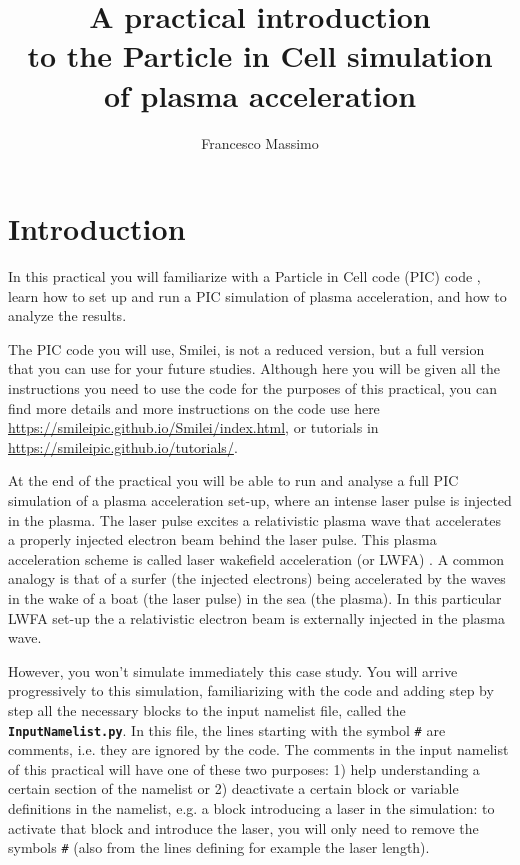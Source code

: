 \documentclass[a4paper,12pt]{extarticle}
\title{\vspace{-2.cm}A practical introduction \\to the Particle in Cell simulation \\of plasma acceleration}
\author{Francesco Massimo}
\newcommand{\smilei}{{\sc Smilei}\xspace}
\newcommand{\commandline}[1]{\texttt{\textbf{#1}}}
\begin{document}
\maketitle

\tableofcontents

\section{Introduction} %
In this practical you will familiarize with a Particle in Cell code (PIC) code \cite{LapentaPIC,BirdsallLangdon2004}, learn how to set up and run a PIC simulation of plasma acceleration, and how to analyze the results.

The PIC code you will use, \smilei \cite{Smilei2018}, is not a reduced version, but a full version that you can use for your future studies. Although here you will be given all the instructions you need to use the code for the purposes of this practical, you can find more details and more instructions on the code use here \url{https://smileipic.github.io/Smilei/index.html}, or tutorials in \url{https://smileipic.github.io/tutorials/}.

At the end of the practical you will be able to run and analyse a full PIC simulation of a plasma acceleration set-up, where an intense laser pulse is injected in the plasma. The laser pulse excites a relativistic plasma wave that accelerates a properly injected electron beam behind the laser pulse.  This plasma acceleration scheme is called laser wakefield acceleration (or LWFA) \cite{TajimaDawson79,Malka2002,Esarey2009,Malka2012}.  A common analogy is that of a surfer (the injected electrons) being accelerated by the waves in the wake of a boat (the laser pulse) in the sea (the plasma).  In this particular LWFA set-up the a relativistic electron beam is externally injected in the plasma wave.

However, you won't simulate immediately this case study.  You will arrive progressively to this simulation, familiarizing with the code and adding step by step all the necessary blocks to the input namelist file, called the \commandline{InputNamelist.py}. In this file, the lines starting with the symbol \texttt{\#} are comments, i.e. they are ignored by the code. The comments in the input namelist of this practical will have one of these two purposes: 1) help understanding a certain section of the namelist or 2) deactivate a certain block or variable definitions in the namelist, e.g. a block introducing a laser in the simulation: to activate that block and introduce the laser, you will only need to remove the symbols \texttt{\#} (also from the lines defining for example the laser length).
\end{document}
